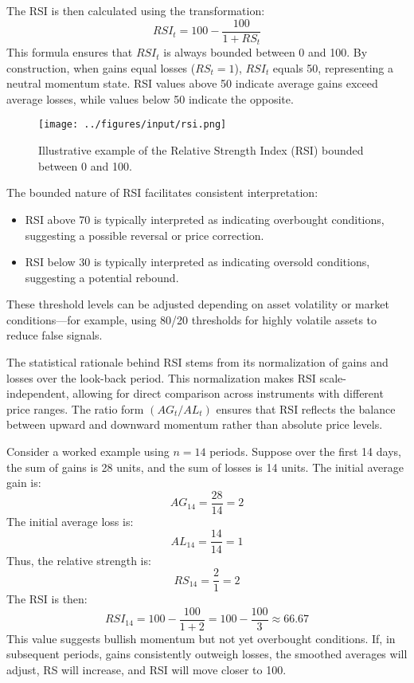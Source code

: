 The RSI is then calculated using the transformation:
\[
RSI_t = 100 - \frac{100}{1 + RS_t}
\]
This formula ensures that $RSI_t$ is always bounded between 0 and 100. By construction, when gains equal losses ($RS_t = 1$), $RSI_t$ equals 50, representing a neutral momentum state. RSI values above 50 indicate average gains exceed average losses, while values below 50 indicate the opposite.


\begin{figure}[H]
    \centering
    \texttt{[image: ../figures/input/rsi.png]}
    \caption{Illustrative example of the Relative Strength Index (RSI) bounded between 0 and 100.}
\end{figure}


The bounded nature of RSI facilitates consistent interpretation:
\begin{itemize}
    \item RSI above 70 is typically interpreted as indicating overbought conditions, suggesting a possible reversal or price correction.
    \item RSI below 30 is typically interpreted as indicating oversold conditions, suggesting a potential rebound.
\end{itemize}
These threshold levels can be adjusted depending on asset volatility or market conditions—for example, using 80/20 thresholds for highly volatile assets to reduce false signals.

The statistical rationale behind RSI stems from its normalization of gains and losses over the look-back period. This normalization makes RSI scale-independent, allowing for direct comparison across instruments with different price ranges. The ratio form $(AG_t / AL_t)$ ensures that RSI reflects the balance between upward and downward momentum rather than absolute price levels.

Consider a worked example using $n=14$ periods. Suppose over the first 14 days, the sum of gains is 28 units, and the sum of losses is 14 units. The initial average gain is:
\[
AG_{14} = \frac{28}{14} = 2
\]
The initial average loss is:
\[
AL_{14} = \frac{14}{14} = 1
\]
Thus, the relative strength is:
\[
RS_{14} = \frac{2}{1} = 2
\]
The RSI is then:
\[
RSI_{14} = 100 - \frac{100}{1 + 2} = 100 - \frac{100}{3} \approx 66.67
\]
This value suggests bullish momentum but not yet overbought conditions. If, in subsequent periods, gains consistently outweigh losses, the smoothed averages will adjust, RS will increase, and RSI will move closer to 100.

